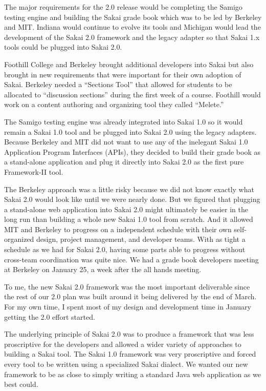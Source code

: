 \documentclass[12pt]{book}
\begin{document}
The major requirements for the 2.0 release would be
completing the Samigo testing engine and building
the Sakai grade book which was to be led by Berkeley
and MIT.  Indiana would continue to evolve its tools
and Michigan would lead the development of the Sakai
2.0 framework and the legacy adapter so that Sakai 1.x
tools could be plugged into Sakai 2.0.

Foothill College and Berkeley brought additional developers
into Sakai but also brought in new requirements that
were important for their own adoption of Sakai.  Berkeley
needed a ``Sections Tool'' that allowed for students
to be allocated to ``discussion sections'' during the
first week of a course.  Foothill would work on a
content authoring and organizing tool they called
``Melete.''

The Samigo testing engine was already integrated into
Sakai 1.0 so it would remain a Sakai 1.0 tool
and be plugged into Sakai 2.0 using the legacy
adapters.  Because Berkeley and MIT did not want to use
any of the inelegant Sakai 1.0 Application
Program Interfaces (APIs),
they decided to build their grade book as a
stand-alone application and plug it directly into
Sakai 2.0 as the first pure Framework-II tool.

The Berkeley approach was a little risky because
we did not know exactly what Sakai 2.0 would look like
until we were nearly done.   But we figured that
plugging a stand-alone web application into Sakai 2.0
might ultimately be easier in the long run than
building a whole new Sakai 1.0 tool from scratch.
And it allowed MIT and Berkeley to progress on
a independent schedule with their own
self-organized design, project management,
and developer teams.  With as
tight a schedule as we had for Sakai 2.0, having
some parts able to progress without cross-team
coordination was quite nice.  We had a grade book
developers meeting at Berkeley on January 25, a week
after the all hands meeting.

To me, the new Sakai 2.0 framework was the most important
deliverable since the rest of our 2.0 plan was built
around it being delivered by the end of March.
For my own time, I spent most of my design and
development time in January getting the 2.0 effort
started.

The underlying principle of Sakai 2.0 was to produce a
framework that was less proscriptive for the developers
and allowed a wider variety of approaches to building
a Sakai tool. The Sakai 1.0 framework was very proscriptive
and forced every tool to be written using a specialized
Sakai dialect.  We wanted our new framework to be
as close to simply writing a standard Java web application
as we best could.
\end{document}
